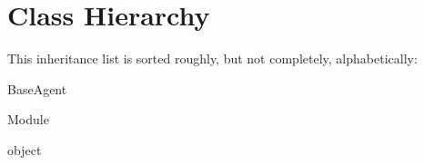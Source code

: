 \section{Class Hierarchy}
This inheritance list is sorted roughly, but not completely, alphabetically\+:\begin{DoxyCompactList}
\item Base\+Agent\begin{DoxyCompactList}
\item {}
\end{DoxyCompactList}
\item Module\begin{DoxyCompactList}
\item {}
\end{DoxyCompactList}
\item object\begin{DoxyCompactList}
\item {}
\end{DoxyCompactList}
\end{DoxyCompactList}
